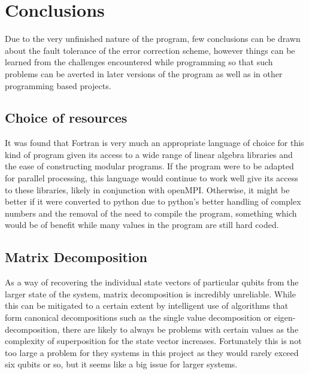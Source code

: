 
\chapter{Conclusions} %

\label{ch:conclu} %

Due to the very unfinished nature of the program, few conclusions can be drawn about the fault tolerance of the error correction scheme, however things can be learned from the challenges encountered while programming so that such problems can be averted in later versions of the program as well as in other programming based projects.



\section{Choice of resources}

It was found that Fortran is very much an appropriate language of choice for this kind of program given its access to a wide range of linear algebra libraries and the ease of constructing modular programs. If the program were to be adapted for parallel processing, this language would continue to work well give its access to these libraries, likely in conjunction with openMPI. Otherwise, it might be better if it were converted to python due to python's better handling of complex numbers and the removal of the need to compile the program, something which would be of benefit while many values in the program are still hard coded. 


\section{Matrix Decomposition}

As a way of recovering the individual state vectors of particular qubits from the larger state of the system, matrix decomposition is incredibly unreliable. While this can be mitigated to a certain extent by intelligent use of algorithms that form canonical decompositions such as the single value decomposition or eigen-decomposition, there are likely to always be problems with certain values as the complexity of superposition for the state vector increases. Fortunately this is not too large a problem for they systems in this project as they would rarely exceed six qubits or so, but it seems like a big issue for larger systems. 

